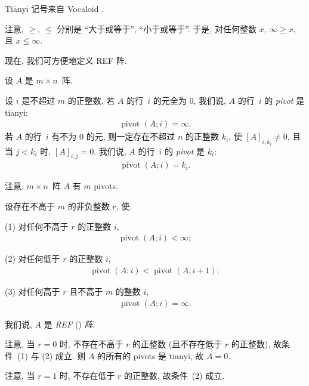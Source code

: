 \documentclass[../libro.tex]{subfiles}
\begin{document}
Tiānyī 记号来自 Vocaloid
\href{https://zh.moegirl.org.cn/洛天依}{}.

注意, \(\geq\), \(\leq\) 分别是
``大于或等于'', ``小于或等于''.
于是, 对任何整数 \(x\),
\(\infty \geq x\),
且 \(x \leq \infty\).

现在, 我们可方便地定义 REF 阵.

\begin{definition}
    设 \(A\) 是 \(m \times n\)~阵.

    设 \(i\) 是不超过 \(m\) 的正整数.
    若 \(A\) 的行~\(i\) 的元全为 \(0\),
    我们说, \(A\) 的行~\(i\) 的 \emph{pivot} 是 tianyi:
    \begin{align*}
        \operatorname{pivot} {(A; i)} = \infty.
    \end{align*}
    若 \(A\) 的行~\(i\) 有不为 \(0\) 的元,
    则一定存在不超过 \(n\) 的正整数 \(k_i\),
    使 \([A]_{i,k_i} \neq 0\),
    且当 \(j < k_i\) 时, \([A]_{i,j} = 0\).
    我们说, \(A\) 的行~\(i\) 的 \emph{pivot} 是 \(k_i\):
    \begin{align*}
        \operatorname{pivot} {(A; i)} = k_i.
    \end{align*}

    注意, \(m \times n\)~阵 \(A\) 有 \(m\) pivots.

    设存在不高于 \(m\) 的非负整数 \(r\), 使:

    (1)
    对任何不高于 \(r\) 的正整数 \(i\),
    \begin{align*}
        \operatorname{pivot} {(A; i)} < \infty;
    \end{align*}

    (2)
    对任何低于 \(r\) 的正整数 \(i\),
    \begin{align*}
        \operatorname{pivot} {(A; i)}
        < \operatorname{pivot} {(A; i + 1)};
    \end{align*}

    (3)
    对任何高于 \(r\) 且不高于 \(m\) 的整数 \(i\),
    \begin{align*}
        \operatorname{pivot} {(A; i)} = \infty.
    \end{align*}

    我们说, \(A\) 是 \emph{REF}
    () \emph{阵}.
\end{definition}

注意, 当 \(r = 0\) 时,
不存在不高于 \(r\) 的正整数
(且不存在低于 \(r\) 的正整数),
故条件~(1) 与 (2) 成立.
则 \(A\) 的所有的 pivots 是 tianyi,
故 \(A = 0\).

注意, 当 \(r = 1\) 时,
不存在低于 \(r\) 的正整数,
故条件~(2) 成立.
\end{document}
